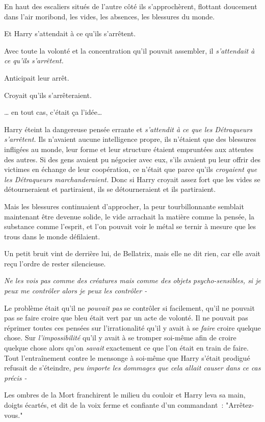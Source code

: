 En haut des escaliers situés de l'autre côté ils s'approchèrent, flottant doucement dans l'air moribond, les vides, les absences, les blessures du monde.

Et Harry s'attendait à ce qu'ils s'arrêtent.

Avec toute la volonté et la concentration qu'il pouvait assembler, il \emph{s'attendait à ce qu'ils s'arrêtent.}

Anticipait leur arrêt.

Croyait qu'ils s'arrêteraient.

… en tout cas, c'était ça l'idée…

Harry éteint la dangereuse pensée errante et \emph{s'attendit à ce que les Détraqueurs s'arrêtent.} Ils n'avaient aucune intelligence propre, ils n'étaient que des blessures infligées au monde, leur forme et leur structure étaient empruntées aux attentes des autres. Si des gens avaient pu négocier avec eux, s'ils avaient pu leur offrir des victimes en échange de leur coopération, ce n'était que parce qu'ils \emph{croyaient que les Détraqueurs marchanderaient.} Donc si Harry croyait assez fort que les vides se détourneraient et partiraient, ils se détourneraient et ils partiraient.

Mais les blessures continuaient d'approcher, la peur tourbillonnante semblait maintenant être devenue solide, le vide arrachait la matière comme la pensée, la substance comme l'esprit, et l'on pouvait voir le métal se ternir à mesure que les trous dans le monde défilaient.

Un petit bruit vint de derrière lui, de Bellatrix, mais elle ne dit rien, car elle avait reçu l'ordre de rester silencieuse.

\emph{Ne les vois pas comme des créatures mais comme des objets psycho-sensibles, si je peux me contrôler alors je peux les contrôler -}

Le problème était qu'il ne \emph{pouvait pas} se contrôler si facilement, qu'il ne pouvait pas se faire croire que bleu était vert par un acte de volonté. Il ne pouvait pas réprimer toutes ces pensées sur l'irrationalité qu'il y avait à se \emph{faire} croire quelque chose. Sur \emph{l'impossibilité} qu'il y avait à se tromper soi-même afin de croire quelque chose alors qu'on \emph{savait} exactement ce que l'on était en train de faire. Tout l'entraînement contre le mensonge à soi-même que Harry s'était prodigué refusait de s'éteindre, \emph{peu importe les dommages que cela allait causer dans ce cas précis -}

Les ombres de la Mort franchirent le milieu du couloir et Harry leva sa main, doigts écartés, et dit de la voix ferme et confiante d'un commandant~: "Arrêtez-vous."


